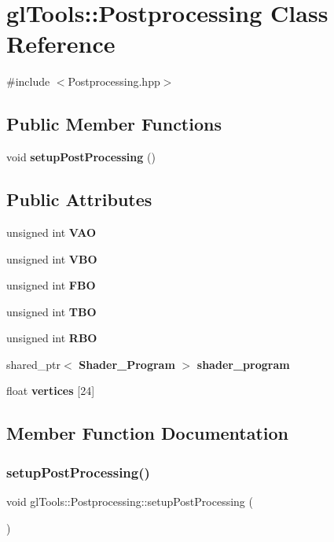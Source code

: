 \section{gl\+Tools\+::Postprocessing Class Reference}
\label{classgl_tools_1_1_postprocessing}


{\ttfamily \#include $<$Postprocessing.\+hpp$>$}

\subsection*{Public Member Functions}
\begin{DoxyCompactItemize}
\item 
void \textbf{ setup\+Post\+Processing} ()
\end{DoxyCompactItemize}
\subsection*{Public Attributes}
\begin{DoxyCompactItemize}
\item 
unsigned int \textbf{ V\+AO}
\item 
unsigned int \textbf{ V\+BO}
\item 
unsigned int \textbf{ F\+BO}
\item 
unsigned int \textbf{ T\+BO}
\item 
unsigned int \textbf{ R\+BO}
\item 
shared\+\_\+ptr$<$ \textbf{ Shader\+\_\+\+Program} $>$ \textbf{ shader\+\_\+program}
\item 
float \textbf{ vertices} [24]
\end{DoxyCompactItemize}


\subsection{Member Function Documentation}
\mbox{\label{classgl_tools_1_1_postprocessing_a147b28dce0e13a179cc90bc7d42f8e28}} 
\subsubsection{setupPostProcessing()}
{\footnotesize\ttfamily void gl\+Tools\+::\+Postprocessing\+::setup\+Post\+Processing (\begin{DoxyParamCaption}{ }\end{DoxyParamCaption})\hspace{0.3cm}{\ttfamily [inline]}}



